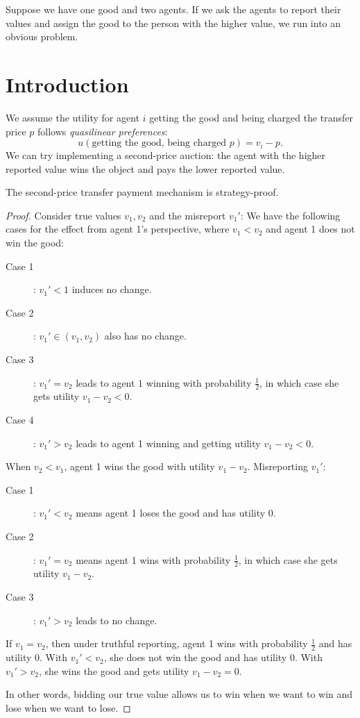 
Suppose we have one good and two agents. If we ask the agents to report their values and assign the good to the person with the higher value, we run into an obvious problem.

\section{Introduction}

We assume the utility for agent $i$ getting the good and being charged the transfer price $p$ follows \emph{quasilinear preferences}: \[
	u\left( \text{getting the good, being charged }p \right) = v_i - p
.\] 
We can try implementing a second-price auction: the agent with the higher reported value wins the object and pays the lower reported value.
\begin{proposition}
	The second-price transfer payment mechanism is strategy-proof.
\end{proposition}
\begin{proof}
	Consider true values $v_1,v_2$ and the misreport $v_1'$:
	We have the following cases for the effect from agent 1's perspective, where $v_1 < v_2$ and agent 1 does not win the good:
	\begin{description}
		\item[Case 1]: $v_1' <1$ induces no change.
		\item[Case 2]: $v_1' \in \left( v_1,v_2 \right)$ also has no change.
		\item[Case 3]: $v_1' = v_2$ leads to agent $1$ winning with probability $\frac{1}{2}$, in which case she gets utility $v_1-v_2 < 0$.
		\item[Case 4]: $v_1' > v_2$ leads to agent 1 winning and getting utility $v_1 - v_2 < 0$.
	\end{description}
	When $v_2 < v_1$, agent 1 wins the good with utility $v_1-v_2$. Misreporting $v_1'$:
	\begin{description}
		\item[Case 1]: $v_1' < v_2$ means agent 1 loses the good and has utility $0$.
		\item[Case 2]: $v_1' = v_2$ means agent 1 wins with probability $\frac{1}{2}$, in which case she gets utility $v_1 - v_2$.
		\item[Case 3]: $v_1' > v_2$ leads to no change.
	\end{description}
	If $v_1=v_2$, then under truthful reporting, agent 1 wins with probability $\frac{1}{2}$ and has utility $0$. With $v_1' < v_2$, she does not win the good and has utility $0$. With $v_1' > v_2$, she wins the good and gets utility $v_1 - v_2 =0$.

	In other words, bidding our true value allows us to win when we want to win and lose when we want to lose.
\end{proof}

